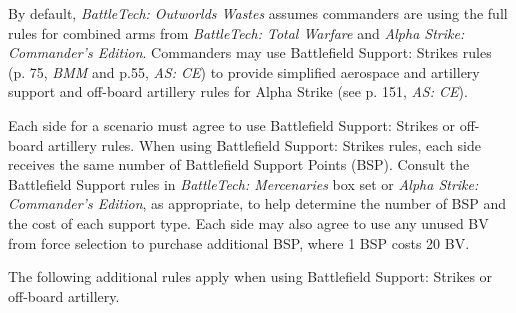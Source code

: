 By default, \emph{BattleTech: Outworlds Wastes} assumes commanders are using the full rules for combined arms from \emph{BattleTech: Total Warfare} and \emph{Alpha Strike: Commander's Edition}.
Commanders may use Battlefield Support: Strikes rules (p. 75, \emph{BMM}  and p.55, \emph{AS: CE}) to provide simplified aerospace and artillery support and off-board artillery rules for Alpha Strike (see p. 151, \emph{AS: CE}).

Each side for a scenario must agree to use Battlefield Support: Strikes or off-board artillery rules.
When using Battlefield Support: Strikes rules, each side receives the same number of Battlefield Support Points (BSP).
Consult the Battlefield Support rules in \emph{BattleTech: Mercenaries} box set or \emph{Alpha Strike: Commander's Edition}, as appropriate, to help determine the number of BSP and the cost of each support type.
Each side may also agree to use any unused BV from force selection to purchase additional BSP, where 1 BSP costs 20 BV.

The following additional rules apply when using Battlefield Support: Strikes or off-board artillery.

